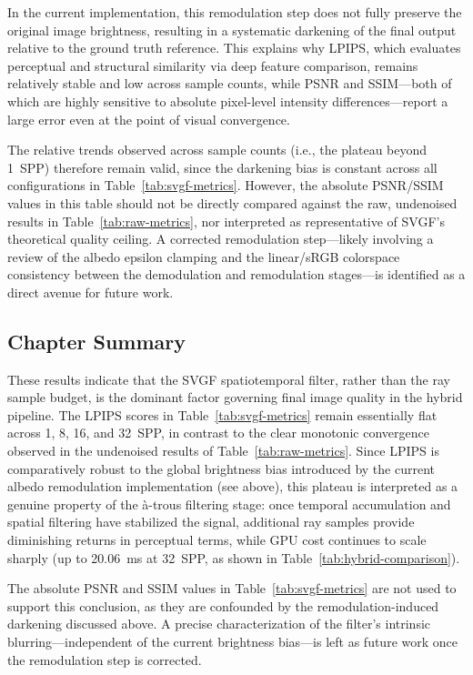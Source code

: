 \documentclass[12pt,a4paper]{report}
\begin{document}
In the current implementation, this remodulation step does not fully preserve the original image brightness, resulting in a systematic darkening of the final output relative to the ground truth reference.
This explains why LPIPS, which evaluates perceptual and structural similarity via deep feature comparison, remains relatively stable and low across sample counts,
while PSNR and SSIM---both of which are highly sensitive to absolute pixel-level intensity differences---report a large error even at the point of visual convergence. 

The relative trends observed across sample counts (i.e., the plateau beyond 1~SPP) therefore remain valid, since the darkening bias is constant across all configurations in Table~\ref{tab:svgf-metrics}. However, the absolute PSNR/SSIM values in this table should not be directly compared against the raw, undenoised results in Table~\ref{tab:raw-metrics}, nor interpreted as representative of SVGF's theoretical quality ceiling. A corrected remodulation step---likely involving a review of the albedo epsilon clamping and the linear/sRGB colorspace consistency between the demodulation and remodulation stages---is identified as a direct avenue for future work.

\subsection{Chapter Summary}
These results indicate that the SVGF spatiotemporal filter, rather than the ray sample budget, is the dominant factor governing final image quality in the hybrid pipeline.
The LPIPS scores in Table~\ref{tab:svgf-metrics} remain essentially flat across 1, 8, 16, and 32~SPP, in contrast to the clear monotonic convergence observed in the undenoised results of Table~\ref{tab:raw-metrics}.
Since LPIPS is comparatively robust to the global brightness bias introduced by the current albedo remodulation implementation (see above),
this plateau is interpreted as a genuine property of the \`a-trous filtering stage: once temporal accumulation and spatial filtering have stabilized the signal, additional ray samples provide diminishing returns in perceptual terms,
while GPU cost continues to scale sharply (up to 20.06~ms at 32~SPP, as shown in Table~\ref{tab:hybrid-comparison}).

The absolute PSNR and SSIM values in Table~\ref{tab:svgf-metrics} are not used to support this conclusion, as they are confounded by the remodulation-induced darkening discussed above.
A precise characterization of the filter's intrinsic blurring---independent of the current brightness bias---is left as future work once the remodulation step is corrected.
\end{document}
